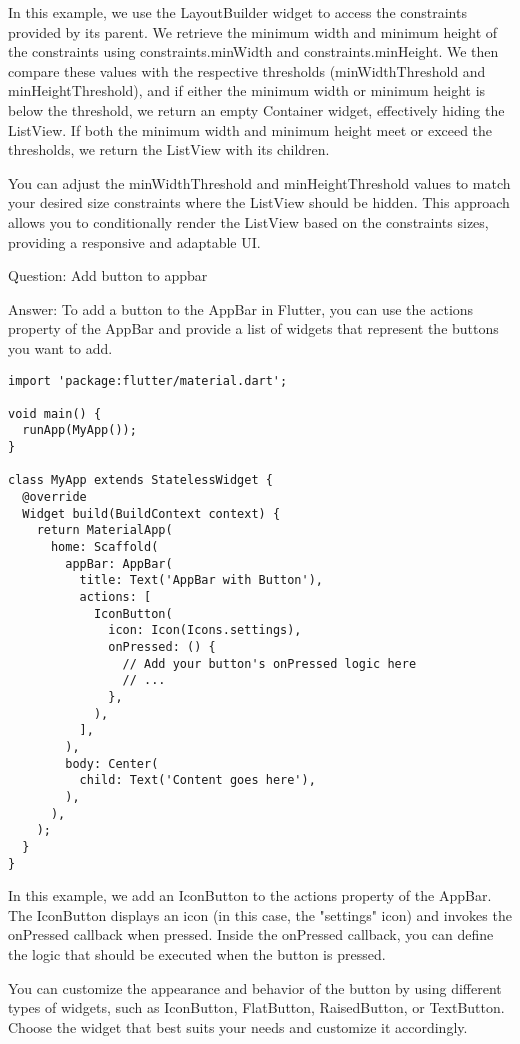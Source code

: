 In this example, we use the LayoutBuilder widget to access the constraints provided by its parent. We retrieve the 
minimum width and minimum height of the constraints using constraints.minWidth and constraints.minHeight. We then 
compare these values with the respective thresholds (minWidthThreshold and minHeightThreshold), and if either the 
minimum width or minimum height is below the threshold, we return an empty Container widget, effectively hiding 
the ListView. If both the minimum width and minimum height meet or exceed the thresholds, we return the ListView 
with its children.

You can adjust the minWidthThreshold and minHeightThreshold values to match your desired size constraints where 
the ListView should be hidden. This approach allows you to conditionally render the ListView based on the 
constraints sizes, providing a responsive and adaptable UI.

Question: Add button to appbar

Answer: To add a button to the AppBar in Flutter, you can use the actions property of the AppBar and provide a 
list of widgets that represent the buttons you want to add.

\begin{lstlisting}
import 'package:flutter/material.dart';

void main() {
  runApp(MyApp());
}

class MyApp extends StatelessWidget {
  @override
  Widget build(BuildContext context) {
    return MaterialApp(
      home: Scaffold(
        appBar: AppBar(
          title: Text('AppBar with Button'),
          actions: [
            IconButton(
              icon: Icon(Icons.settings),
              onPressed: () {
                // Add your button's onPressed logic here
                // ...
              },
            ),
          ],
        ),
        body: Center(
          child: Text('Content goes here'),
        ),
      ),
    );
  }
}
\end{lstlisting}

In this example, we add an IconButton to the actions property of the AppBar. The IconButton displays an icon (in this 
case, the "settings" icon) and invokes the onPressed callback when pressed. Inside the onPressed callback, you can 
define the logic that should be executed when the button is pressed.

You can customize the appearance and behavior of the button by using different types of widgets, such as IconButton, 
FlatButton, RaisedButton, or TextButton. Choose the widget that best suits your needs and customize it accordingly.

